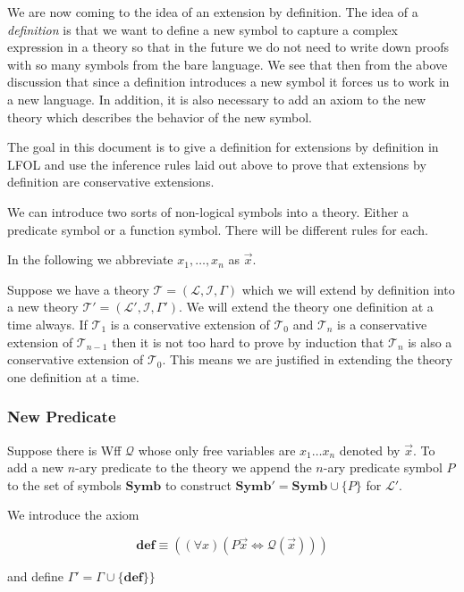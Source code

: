 \documentclass[12pt]{article}
\newcommand{\bv}[1]{\boldsymbol{#1}}
\newcommand{\mc}[1]{\mathcal{#1}}
\newcommand{\bc}[1]{\bv{\mc{#1}}}
\begin{document}
We are now coming to the idea of an extension by definition. The idea of a \textit{definition} is that we want to define a new symbol to capture a complex expression in a theory so that in the future we do not need to write down proofs with so many symbols from the bare language. We see that then from the above discussion that since a definition introduces a new symbol it forces us to work in a new language. In addition, it is also necessary to add an axiom to the new theory which describes the behavior of the new symbol. 

The goal in this document is to give a definition for extensions by definition in LFOL and use the inference rules laid out above to prove that extensions by definition are conservative extensions.

We can introduce two sorts of non-logical symbols into a theory. Either a predicate symbol or a function symbol. There will be different rules for each.

In the following we abbreviate $x_1,\ldots,x_n$ as $\vec{x}$.

Suppose we have a theory $\bc{T} = (\bv{\mc{L}},\bc{I},\Gamma)$ which we will extend by definition into a new theory $\bc{T}' = (\bv{\mc{L}}',\bc{I},\Gamma')$. We will extend the theory one definition at a time always. If $\bc{T}_1$ is a conservative extension of $\bc{T}_0$ and $\bc{T}_n$ is a conservative extension of $\bc{T}_{n-1}$ then it is not too hard to prove by induction that $\bc{T}_n$ is also a conservative extension of $\bc{T}_0$. This means we are justified in extending the theory one definition at a time.

\subsubsection*{New Predicate}

Suppose there is Wff $\mc{Q}$ whose only free variables are $x_1\ldots x_n$ denoted by $\vec{x}$. To add a new $n$-ary predicate to the theory we append the $n$-ary predicate symbol $P$ to the set of symbols $\mathbf{Symb}$ to construct $\mathbf{Symb}' = \mathbf{Symb}\cup \{P\}$ for $\bv{\mc{L}}'$.

We introduce the axiom

\begin{equation}
\textbf{def} \equiv ((\forall x)(P\vec{x} \iff \mc{Q}(\vec{x})))
\end{equation}

and define $\Gamma' = \Gamma \cup \{\textbf{def}\} \}$
\end{document}
